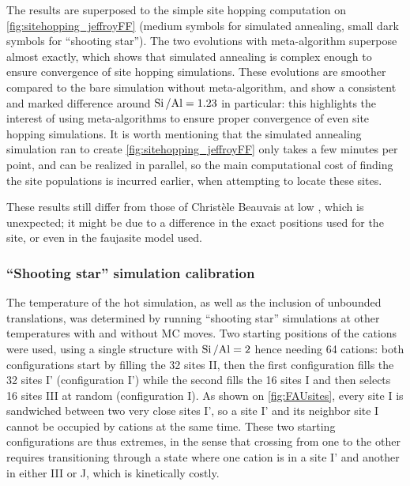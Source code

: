 \documentclass[main.tex]{subfiles}
\begin{document}
The results are superposed to the simple site hopping computation on \cref{fig:sitehopping_jeffroyFF} (medium symbols for simulated annealing, small dark symbols for ``shooting star''). The two evolutions with meta-algorithm superpose almost exactly, which shows that simulated annealing is complex enough to ensure convergence of site hopping simulations. These evolutions are smoother compared to the bare simulation without meta-algorithm, and show a consistent and marked difference around $\mbox{Si\,/Al} = 1.23$ in particular: this highlights the interest of using meta-algorithms to ensure proper convergence of even site hopping simulations. It is worth mentioning that the simulated annealing simulation ran to create \cref{fig:sitehopping_jeffroyFF} only takes a few minutes per point, and can be realized in parallel, so the main computational cost of finding the site populations is incurred earlier, when attempting to locate these sites.

These results still differ from those of Christèle Beauvais at low \SiAl, which is unexpected; it might be due to a difference in the exact positions used for the site, or even in the faujasite model used.

\subsubsection{``Shooting star'' simulation calibration}

The temperature of the hot simulation, as well as the inclusion of unbounded translations, was determined by running ``shooting star'' simulations at other temperatures with and without MC moves. Two starting positions of the cations were used, using a single structure with $\mbox{Si\,/Al} = 2$ hence needing 64 cations: both configurations start by filling the 32 sites II, then the first configuration fills the 32 sites I' (configuration I') while the second fills the 16 sites I and then selects 16 sites III at random (configuration I). As shown on \cref{fig:FAUsites}, every site I is sandwiched between two very close sites I', so a site I' and its neighbor site I cannot be occupied by cations at the same time. These two starting configurations are thus extremes, in the sense that crossing from one to the other requires transitioning through a state where one cation is in a site I' and another in either III or J, which is kinetically costly.
\end{document}
